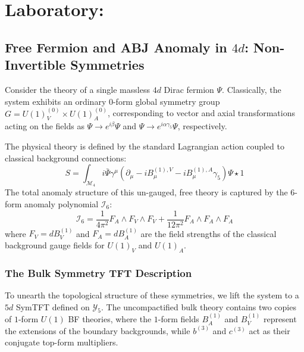 \documentclass[aps,preprint,nofootinbib,preprintnumbers,eqsecnum,superscriptaddress]{revtex4}
\numberwithin{equation}{section}
\begin{document}
\newpage
\section{Laboratory:}

\subsection{Free Fermion and ABJ Anomaly in $4d$: Non-Invertible Symmetries}
\label{sec:abj_example}

Consider the theory of a single massless $4d$ Dirac fermion $\Psi$. Classically, the system exhibits an ordinary $0$-form global symmetry group $G = U(1)^{(0)}_V \times U(1)^{(0)}_A$, corresponding to vector and axial transformations acting on the fields as $\Psi \to e^{i\beta} \Psi$ and $\Psi \to e^{i\alpha \gamma_5} \Psi$, respectively. 

The physical theory is defined by the standard Lagrangian action coupled to classical background connections:
\begin{equation}
    S = \int_{\mathcal{M}_4} i \bar{\Psi} \gamma^\mu \left( \partial_\mu - i B_\mu^{(1),V} - i B_\mu^{(1),A} \gamma_5 \right) \Psi \star 1
\end{equation}
The total anomaly structure of this un-gauged, free theory is captured by the $6$-form anomaly polynomial $\mathcal{I}_6$:
\begin{equation}
    \mathcal{I}_6 = \frac{1}{4 \pi^2} F_A \wedge F_V \wedge F_V + \frac{1}{12 \pi^2} F_A \wedge F_A \wedge F_A
\end{equation}
where $F_V = dB^{(1)}_V$ and $F_A = dB^{(1)}_A$ are the field strengths of the classical background gauge fields for $U(1)_V$ and $U(1)_A$. 

\subsubsection{The Bulk Symmetry TFT Description}

To unearth the topological structure of these symmetries, we lift the system to a $5d$ SymTFT defined on $\mathcal{Y}_5$. The uncompactified bulk theory contains two copies of $1$-form $U(1)$ BF theories, where the $1$-form fields $B^{(1)}_A$ and $B^{(1)}_V$ represent the extensions of the boundary backgrounds, while $b^{(3)} $ and $c^{(3)} $ act as their conjugate top-form multipliers. 
\end{document}
